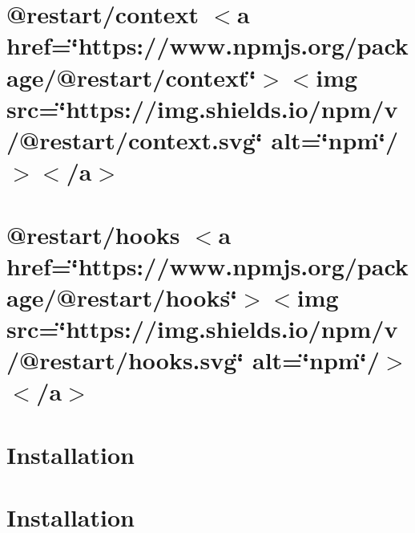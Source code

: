 \let\mypdfximage\pdfximage\def\pdfximage{\immediate\mypdfximage}\documentclass[twoside]{book}
\newcommand{\+}{\discretionary{\mbox{\scriptsize$\hookleftarrow$}}{}{}}
\begin{document}
\chapter{@restart/context $<$a href=\char`\"{}https\+://www.\+npmjs.\+org/package/@restart/context\char`\"{}$>$$<$img src=\char`\"{}https\+://img.\+shields.\+io/npm/v/@restart/context.\+svg\char`\"{} alt=\char`\"{}npm\char`\"{}/$>$$<$/a$>$}
\label{md__c___users_zhart__one_drive__desktop_school_capstone_workspace_capstone_flight_risk_assesmentdd306e391e20dc6652c03faee22c36e3}

\chapter{@restart/hooks $<$a href=\char`\"{}https\+://www.\+npmjs.\+org/package/@restart/hooks\char`\"{}$>$$<$img src=\char`\"{}https\+://img.\+shields.\+io/npm/v/@restart/hooks.\+svg\char`\"{} alt=\char`\"{}npm\char`\"{}/$>$$<$/a$>$}
\label{md__c___users_zhart__one_drive__desktop_school_capstone_workspace_capstone_flight_risk_assesment511de3b5bebb8a10e863a5ef78f0a61e}

\chapter{Installation}
\label{md__c___users_zhart__one_drive__desktop_school_capstone_workspace_capstone_flight_risk_assesmentccfdc70a441cc69a9436dccd6fc5856c}

\chapter{Installation}
\label{md__c___users_zhart__one_drive__desktop_school_capstone_workspace_capstone_flight_risk_assesment9ba08c47994823a7c43c4a4e847a3c9e}

\end{document}
